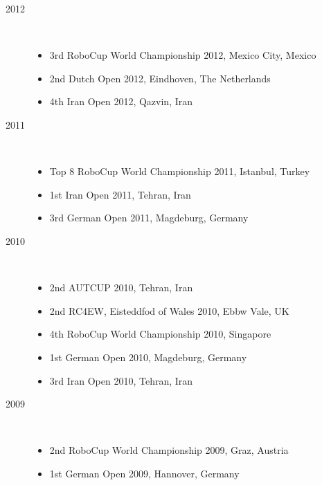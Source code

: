 \documentclass{llncs}
\begin{document}
\begin{description}

\item[2012] ~ \\
  \begin{itemize}
    \item 3rd RoboCup World Championship 2012, Mexico City, Mexico
    \item 2nd Dutch Open 2012, Eindhoven, The Netherlands
    \item 4th Iran Open 2012, Qazvin, Iran
  \end{itemize}
  \item[2011] ~ \\
    \begin{itemize}
      \item Top 8 RoboCup World Championship 2011, Istanbul, Turkey
      \item 1st Iran Open 2011, Tehran, Iran
      \item 3rd German Open 2011, Magdeburg, Germany
    \end{itemize}
  \item[2010] ~ \\
    \begin{itemize}
      \item 2nd AUTCUP 2010, Tehran, Iran
      \item 2nd RC4EW, Eisteddfod of Wales 2010, Ebbw Vale, UK
      \item 4th RoboCup World Championship 2010, Singapore
      \item 1st German Open 2010, Magdeburg, Germany
      \item 3rd Iran Open 2010, Tehran, Iran
    \end{itemize}
  \item [2009] ~ \\
    \begin{itemize}
      \item 2nd RoboCup World Championship 2009, Graz, Austria
      \item 1st German Open 2009, Hannover, Germany
    \end{itemize}
\end{description}



\end{document}
